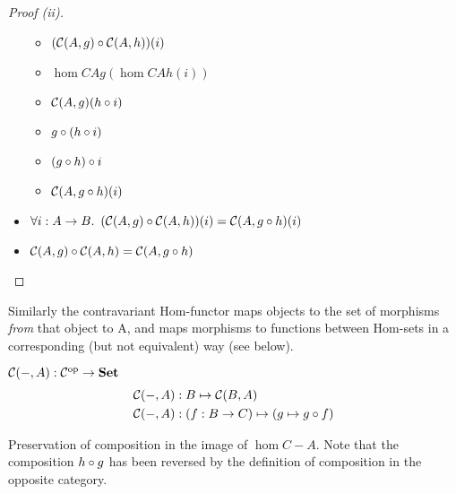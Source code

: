 \begin{prop}
\begin{proof}[Proof (ii)]
\begin{itemize}
\begin{itemize}
          \item[\phs]
            $(\mathcal{C}(A, g)\circ\mathcal{C}(A, h))(i)$

          \item[\eqs] $\hom{C}{A}{g}(\hom{C}{A}{h}(i))$
            \marginnote{\Def-$\compose$}

          \item[\eqs] $\mathcal{C}(A, g)(h\circ i)$
            \marginnote{\Def-\ref{def:co-hom}}

          \item[\eqs] $g\circ (h\circ i)$
            \marginnote{\Def-\ref{def:co-hom}}

          \item[\eqs] $(g\circ h)\circ i$
            \marginnote{\Assoc-$\compose$}

          \item[\eqs] $\mathcal{C}(A, g\circ h)(i)$
            \marginnote{\Def-\ref{def:co-hom}}
        \end{itemize}

      \item[\imps]
        $\forall i : A\to B\ldotp~(\mathcal{C}(A, g)\circ\mathcal{C}(A, h))(i) = \mathcal{C}(A, g\circ h)(i)$
        \marginnote{$\forall$-\Intro-$\star$}

      \item[\iffs]
        $\mathcal{C}(A, g)\circ\mathcal{C}(A, h) = \mathcal{C}(A, g\circ h)$
        \marginnote{\Def-$=$}
        \qedhere
    \end{itemize}
  \end{proof}
\end{prop}

Similarly the contravariant Hom-functor maps objects to the set of morphisms \textit{from} that object to A, and maps morphisms to functions between Hom-sets in a corresponding (but not equivalent) way (see below).

\begin{definition}\label{def:contra-hom}
  $\mathcal{C}(-, A) : \mathcal{C}^{\text{op}} \to \mathbf{Set}$
  \begin{align*}
    \mathcal{C}(-, A) & : B \mapsto \mathcal{C}(B, A)\\
    \mathcal{C}(-, A) & : (f : B \to C) \mapsto (g \mapsto g \circ f)
  \end{align*}
\end{definition}

\begin{marginfigure}[6em]
  \caption{Preservation of composition in the image of $\hom{C}{-}{A}$. Note that the composition $h\circ g$ has been reversed by the definition of composition in the opposite category.}\label{fig:contra-functor}
\end{marginfigure}

